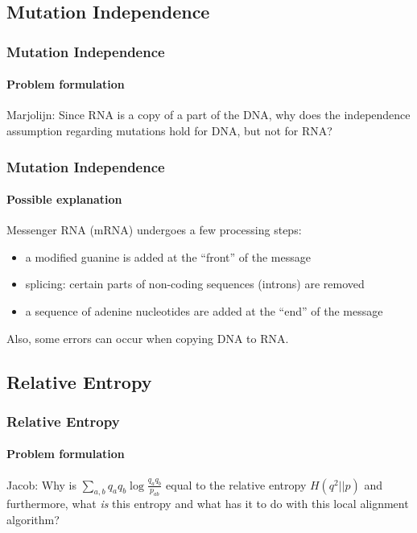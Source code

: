 \documentclass{beamer}
\begin{document}
\subsection{Mutation Independence}

\begin{frame}
  \frametitle{Mutation Independence}
  \framesubtitle{Problem formulation}

  \begin{block}{Marjolijn:}
    Since RNA is a copy of a part of the DNA, why does the independence
    assumption regarding mutations hold for DNA, but not for RNA?
  \end{block}
\end{frame}

\begin{frame}
  \frametitle{Mutation Independence}
  \framesubtitle{Possible explanation}

  Messenger RNA (mRNA) undergoes a few processing steps:
  \begin{itemize}
    \item a modified guanine is added at the ``front'' of the message
    \item splicing: certain parts of non-coding sequences (introns) are removed
    \item a sequence of adenine nucleotides are added at the ``end'' of the message
  \end{itemize}

  Also, some errors can occur when copying DNA to RNA.
\end{frame}

\subsection{Relative Entropy}

\begin{frame}
  \frametitle{Relative Entropy}
  \framesubtitle{Problem formulation}

  \begin{block}{Jacob:}
    Why is \alert{$\displaystyle \sum_{a,b}q_a q_b \log \frac{q_a q_b}{p_{ab}}$}
    equal to the relative entropy \alert{$H(q^2 || p)$} and furthermore,
    what \emph{is} this entropy and what has it to do with this local
    alignment algorithm?
  \end{block}
\end{frame}
\end{document}
